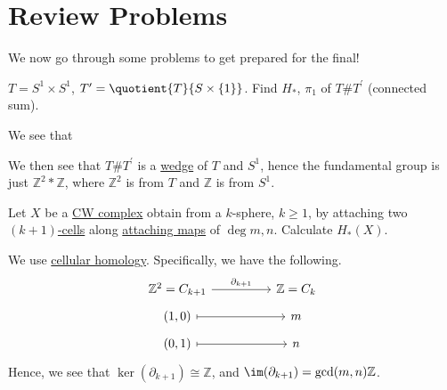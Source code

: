 \section{Review Problems}
We now go through some problems to get prepared for the final!
\begin{exercise}[QR May 2019]
	\(T = S^1 \times S^1\), \(T^\prime = \quotient{T}{S \times \{1\}} \). Find \(H_\ast\), \(\pi _1\) of \(T \# T^\prime \) (connected sum).
\end{exercise}
\begin{answer}
	We see that
	\begin{figure}[H]
		\centering
		\label{fig:ans:ex-1:lec-40}
	\end{figure}
	We then see that \(T\# T^\prime \) is a \hyperref[CW-complex-wedge-sum]{wedge} of \(T\) and \(S^1\), hence the fundamental group is just
	\(\mathbb{Z} ^{2} \ast \mathbb{Z} \), where \(\mathbb{Z} ^{2} \) is from \(T\) and \(\mathbb{Z} \)
	is from \(S^{1} \).
\end{answer}

\begin{exercise}[QR Aug. 2019]
	Let \(X\) be a \hyperref[def:CW-Complex]{CW complex} obtain from a \(k\)-sphere, \(k\geq 1\), by attaching two \hyperref[def:cell]{\((k+1)\)-cells}
	along \hyperref[def:attaching-map]{attaching maps} of \(\deg m, n\). Calculate \(H_\ast (X)\).
\end{exercise}
\begin{answer}
	We use \hyperref[def:cellular-homology-group]{cellular homology}. Specifically, we have the following.
	\[\begin{tikzcd}[row sep=tiny]
			{\mathbb{Z}^2=C_{k+1}} && {\mathbb{Z}=C_k} \\
			{(1, 0)} && m \\
			{(0, 1)} && n
			\arrow[maps to, from=2-1, to=2-3]
			\arrow[maps to, from=3-1, to=3-3]
			\arrow["{\partial_{k+1}}", from=1-1, to=1-3]
		\end{tikzcd}\]
	Hence, we see that \(\ker(\partial _{k+1}) \cong \mathbb{Z} \), and \(\im(\partial _{k+1}) = \gcd(m, n)\mathbb{Z} \).
\end{answer}

